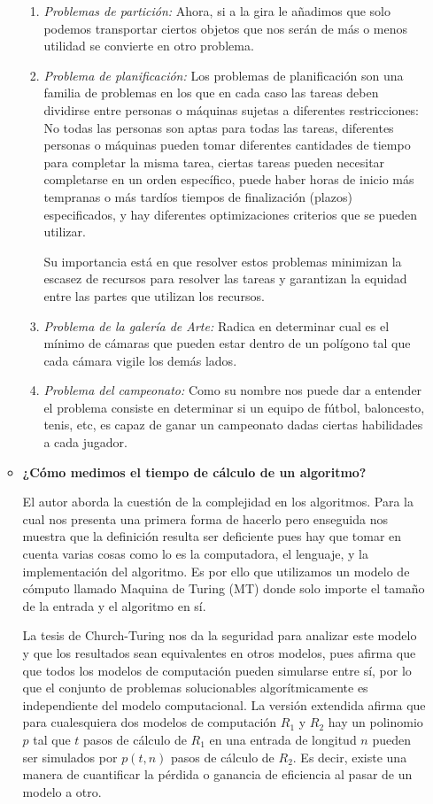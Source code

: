 \documentclass[12pt,letterpaper]{article}
\begin{document}
\begin{itemize}
\begin{itemize}[$\blacklozenge$]
\begin{enumerate}
        \item \textit{Problemas de partición:} Ahora, si a la gira le añadimos que solo podemos transportar ciertos objetos que nos serán de más o menos utilidad se convierte en otro problema.
        
        \item \textit{Problema de planificación:} Los problemas de planificación son una familia de problemas  en los que en cada caso las tareas deben dividirse entre personas o máquinas sujetas a diferentes restricciones: No todas las personas son aptas para todas las tareas, diferentes personas o máquinas pueden tomar diferentes cantidades de tiempo para completar la misma tarea, ciertas tareas pueden necesitar completarse en un orden específico, puede haber horas de inicio más tempranas o más tardíos tiempos de finalización (plazos) especificados, y hay diferentes optimizaciones criterios que se pueden utilizar.
        
        Su importancia está en que resolver estos problemas minimizan la escasez de recursos para resolver las tareas y garantizan la equidad entre las partes que utilizan los recursos.
        
        \item \textit{Problema de la galería de Arte:} Radica en determinar cual es el mínimo de cámaras que pueden estar dentro de un polígono tal que cada cámara vigile los demás lados.
        
        \item \textit{Problema del campeonato:} Como su nombre nos puede dar a entender el problema consiste en determinar si un equipo de fútbol, baloncesto, tenis, etc, es capaz de ganar un campeonato dadas ciertas habilidades a cada jugador. 
    \end{enumerate}
    \newpage
    \item \textbf{¿Cómo medimos el tiempo de cálculo de un algoritmo?}
    
    El autor aborda la cuestión de la complejidad en los algoritmos. Para la cual nos presenta una primera forma de hacerlo pero enseguida nos muestra que la definición resulta ser deficiente pues hay que tomar en cuenta varias cosas como lo es la computadora, el lenguaje, y la implementación del algoritmo. Es por ello que utilizamos un modelo de cómputo llamado Maquina de Turing (MT) donde solo importe el tamaño de la entrada y el algoritmo en sí. 
    
    La tesis de Church-Turing nos da la seguridad para analizar este modelo y que los resultados sean equivalentes en otros modelos, pues afirma que que todos los modelos de computación pueden simularse entre sí, por lo que el conjunto de problemas solucionables algorítmicamente es independiente del modelo computacional. 
    La versión extendida afirma que para cualesquiera dos modelos de computación $R_1$ y $R_2$ hay un polinomio $p$ tal que $t$ pasos de cálculo de $R_1$ en una entrada de longitud $n$ pueden ser simulados por $p(t, n)$ pasos de cálculo de $R_2$.
    Es decir, existe una manera de cuantificar la pérdida o ganancia de eficiencia al pasar de un modelo a otro. 
    

\end{itemize}
\end{itemize}
\end{document}
